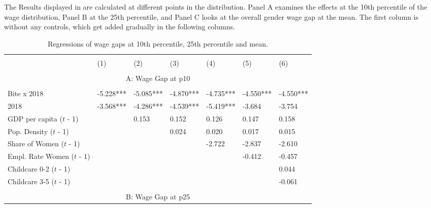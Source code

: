 \documentclass[12pt,draft,a4paper]{article}
\begin{document}

The Results displayed in  are calculated at different points in the distribution. Panel A examines the effects at the 10th percentile of the wage distribution, Panel B at the 25th percentile, and Panel C looks at the overall gender wage gap at the mean. The first column is without any controls, which get added gradually in the following columns.  

\begin{table}[htbp] %
    \caption{Regressions of wage gaps at 10th percentile, 25th percentile and mean.}
    \begin{adjustbox}{width=\textwidth}
    \begin{tabular}{l@{\hskip 10ex}llllll}
    \hline & \\[-1.0em]
                              & (1)       & (2)       & (3)       & (4)       & (5)       & (6)       \\ 
    \hline & \\[-1.0em]
    \multicolumn{7}{c}{A: Wage Gap at p10}                                                            \\
    \hline & \\[-1.0em]
    Bite x 2018               & -5.228*** & -5.085*** & -4.870*** & -4.735*** & -4.550*** & -4.550*** \\
    2018                      & -3.568*** & -4.286*** & -4.539*** & -5.419*** & -3.684    & -3.754    \\
    GDP per capita ($t$ - 1)   &           & 0.153     & 0.152     & 0.126     & 0.147     & 0.158     \\
    Pop. Density ($t$ - 1)     &           &           & 0.024     & 0.020     & 0.017     & 0.015     \\
    Share of Women ($t$ - 1)   &           &           &           & -2.722    & -2.837    & -2.610    \\
    Empl. Rate Women ($t$ - 1) &           &           &           &           & -0.412    & -0.457    \\
    Childcare 0-2 ($t$ - 1)    &           &           &           &           &           & 0.044     \\
    Childcare 3-5 ($t$ - 1)    &           &           &           &           &           & -0.061    \\ 
    \hline & \\[-1.0em]
    \multicolumn{7}{c}{B: Wage Gap at p25}                                                            \\ 

\end{tabular}
\end{adjustbox}
\end{table}
\end{document}
